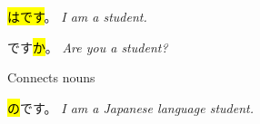     {
    \hl{は}\hl{です}。
    \textit{I am a student.}
    }
    
    {
    です\hl{か}。
    \textit{Are you a student?}
    }

    {
    Connects nouns
    
    \hl{の}です。
    \textit{I am a Japanese language student.}
    }
